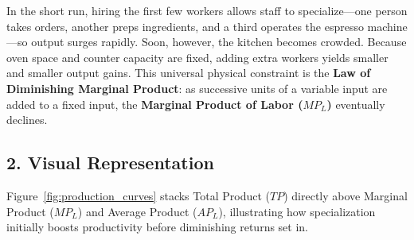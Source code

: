 \documentclass[11pt,letterpaper]{article}
\begin{document}
In the short run, hiring the first few workers allows staff to specialize—one person takes orders, another preps ingredients, and a third operates the espresso machine—so output surges rapidly. Soon, however, the kitchen becomes crowded. Because oven space and counter capacity are fixed, adding extra workers yields smaller and smaller output gains. This universal physical constraint is the \textbf{Law of Diminishing Marginal Product}: as successive units of a variable input are added to a fixed input, the \textbf{Marginal Product of Labor ($MP_L$)} eventually declines.

\subsection*{2. Visual Representation}
Figure~\ref{fig:production_curves} stacks Total Product ($TP$) directly above Marginal Product ($MP_L$) and Average Product ($AP_L$), illustrating how specialization initially boosts productivity before diminishing returns set in.
\end{document}

